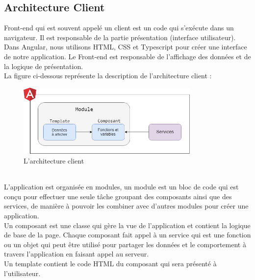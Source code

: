 \subsection{Architecture Client}
Front-end qui est souvent appelé un client est un code qui s'exécute dans un navigateur. Il est responsable de la partie présentation (interface utilisateur). Dans Angular, nous utilisons HTML, CSS et Typescript pour créer une interface de notre application.
Le Front-end est responsable de l'affichage des données et de la logique de présentation.\\
La figure ci-dessous représente la description de l'architecture client :
\begin{figure}[h!]  
 \centering
    \includegraphics[width=0.8\textwidth]{chapitre3/Figures/angular.png}
  \caption{L'architecture client}
\end{figure}
\\
L'application est organisée en modules, un module est un bloc de code qui est conçu pour effectuer une seule tâche groupant des composants ainsi que des services, de manière à pouvoir les combiner avec d'autres modules pour créer une application.\\
Un composant est une classe qui gère la vue de l'application et contient la logique de base de la page. Chaque composant fait appel à un service qui est une fonction ou un objet qui peut être utilisé pour partager les données et le comportement à travers l'application en faisant appel au serveur.\\
Un template contient le code HTML du composant qui sera présenté à l’utilisateur.



